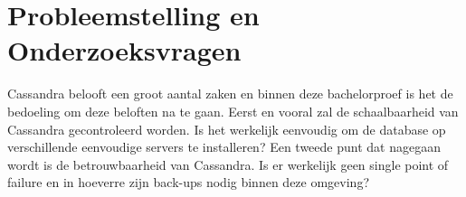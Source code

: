\section{Probleemstelling en Onderzoeksvragen}
\label{sec:onderzoeksvragen}


Cassandra belooft een groot aantal zaken en binnen deze bachelorproef is het de bedoeling om deze beloften na te gaan.
Eerst en vooral zal de schaalbaarheid van Cassandra gecontroleerd worden.
Is het werkelijk eenvoudig om de database op verschillende eenvoudige servers te installeren?
Een tweede punt dat nagegaan wordt is de betrouwbaarheid van Cassandra.
Is er werkelijk geen single point of failure en in hoeverre zijn back-ups nodig binnen deze omgeving?